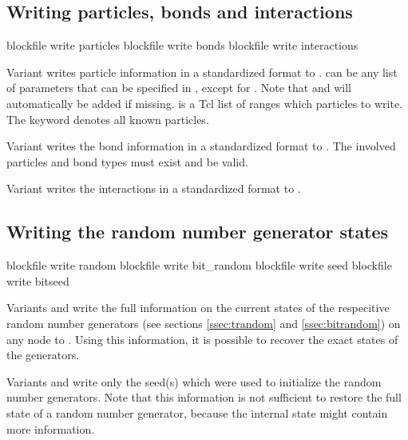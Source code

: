 \subsection{Writing particles, bonds and interactions}
\begin{essyntax}
   blockfile  write particles 
   
   blockfile  write bonds 
   blockfile  write interactions
\end{essyntax}

  Variant  writes
particle information in a standardized format to .
 can be any list of parameters that can be specified in
, except for .  Note that
 and  will automatically be added if missing.
 is a Tcl list of ranges which particles to write.  The
keyword  denotes all known particles.

Variant  writes the bond information in a standardized
format to . The involved particles and bond types must
exist and be valid.

Variant  writes the interactions in a standardized format
to .

\subsection{Writing the random number generator states}
\begin{essyntax}
   blockfile  write random
   blockfile  write bit_random
   blockfile  write seed
   blockfile  write bitseed
\end{essyntax}

Variants  and  write the full information on the
current states of the respecitive random number generators (see
sections \vref{ssec:trandom} and \vref{ssec:bitrandom}) on any node to
.  Using this information, it is possible to recover the
exact states of the generators.

Variants  and  write only the seed(s) which were
used to initialize the random number generators. Note that this
information is not sufficient to restore the full state of a random
number generator, because the internal state might contain more
information.

